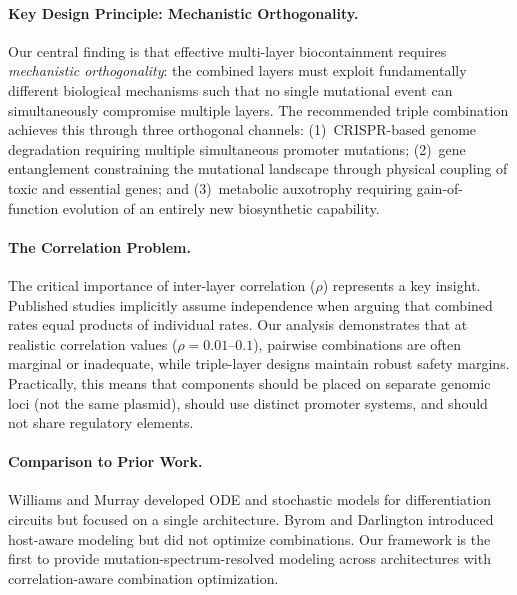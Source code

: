 \documentclass[journal=asbcd6,manuscript=article]{achemso}
\begin{document}
\paragraph{Key Design Principle: Mechanistic Orthogonality.}
Our central finding is that effective multi-layer biocontainment requires \emph{mechanistic orthogonality}: the combined layers must exploit fundamentally different biological mechanisms such that no single mutational event can simultaneously compromise multiple layers. The recommended triple combination achieves this through three orthogonal channels: (1)~CRISPR-based genome degradation requiring multiple simultaneous promoter mutations; (2)~gene entanglement constraining the mutational landscape through physical coupling of toxic and essential genes; and (3)~metabolic auxotrophy requiring gain-of-function evolution of an entirely new biosynthetic capability.

\paragraph{The Correlation Problem.}
The critical importance of inter-layer correlation ($\rho$) represents a key insight. Published studies implicitly assume independence when arguing that combined rates equal products of individual rates\cite{Rottinghaus2022,Chang2023}. Our analysis demonstrates that at realistic correlation values ($\rho = 0.01$--$0.1$), pairwise combinations are often marginal or inadequate, while triple-layer designs maintain robust safety margins. Practically, this means that components should be placed on separate genomic loci (not the same plasmid), should use distinct promoter systems, and should not share regulatory elements.

\paragraph{Comparison to Prior Work.}
Williams and Murray\cite{Williams2022} developed ODE and stochastic models for differentiation circuits but focused on a single architecture. Byrom and Darlington\cite{Byrom2025} introduced host-aware modeling but did not optimize combinations. Our framework is the first to provide mutation-spectrum-resolved modeling across architectures with correlation-aware combination optimization.
\end{document}
